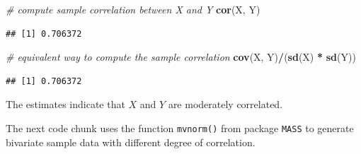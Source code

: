 \documentclass[]{book}
\newenvironment{Shaded}{\begin{snugshade}}{\end{snugshade}}
\newcommand{\KeywordTok}[1]{\textcolor[rgb]{0.13,0.29,0.53}{\textbf{#1}}}
\newcommand{\StringTok}[1]{\textcolor[rgb]{0.31,0.60,0.02}{#1}}
\newcommand{\CommentTok}[1]{\textcolor[rgb]{0.56,0.35,0.01}{\textit{#1}}}
\newcommand{\OperatorTok}[1]{\textcolor[rgb]{0.81,0.36,0.00}{\textbf{#1}}}
\newcommand{\NormalTok}[1]{#1}
\theoremstyle{definition}
\theoremstyle{definition}
\theoremstyle{definition}
\theoremstyle{remark}
\begin{document}
\begin{Shaded}
\begin{Highlighting}[]
\CommentTok{# compute sample correlation between X and Y}
\KeywordTok{cor}\NormalTok{(X, Y)}
\end{Highlighting}
\end{Shaded}

\begin{verbatim}
## [1] 0.706372
\end{verbatim}

\begin{Shaded}
\begin{Highlighting}[]
\CommentTok{# equivalent way to compute the sample correlation}
\KeywordTok{cov}\NormalTok{(X, Y)}\OperatorTok{/}\NormalTok{(}\KeywordTok{sd}\NormalTok{(X) }\OperatorTok{*}\StringTok{ }\KeywordTok{sd}\NormalTok{(Y))}
\end{Highlighting}
\end{Shaded}

\begin{verbatim}
## [1] 0.706372
\end{verbatim}

The estimates indicate that \(X\) and \(Y\) are moderately correlated.

The next code chunk uses the function \texttt{mvnorm()} from package
\texttt{MASS} to generate bivariate sample data with different degree of
correlation.
\end{document}
